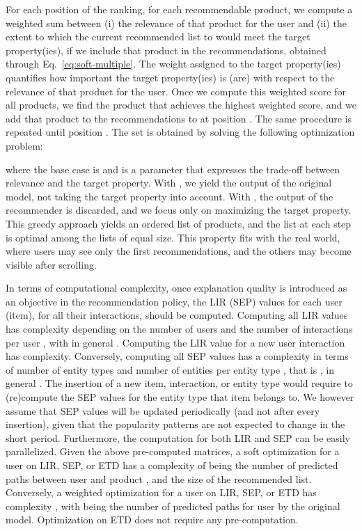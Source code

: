 \documentclass[sigconf]{acmart}
\begin{document}
For each position  of the ranking, for each recommendable product, we compute a weighted sum between (i) the relevance of that product for the user  and (ii) {\color{black} the extent to which the current recommended list to  would meet the target property(ies), if we include that product in the recommendations, obtained through Eq.~\eqref{eq:soft-multiple}.} 
The weight  assigned to the target property(ies) quantifies how important the target property(ies) is (are) with respect to the relevance of that product for the user. 
Once we compute this weighted score for all products, we find the product that achieves the highest weighted score, and we add that product to the recommendations to  at position . 
The same procedure is repeated until position .
The set  is obtained by solving the following optimization problem: 



\noindent where the base case is  and  is a parameter that expresses the trade-off between relevance and the target property. 
With , we yield the output of the original model, not taking the target property into account.
With , the output of the recommender is discarded, and we focus only on maximizing the target property. 
This greedy approach yields an ordered list of products, and the list at each step is  optimal among the lists of equal size. 
This property fits with the real world, where users may see only the first  recommendations, and the others may become visible after scrolling. 

\vspace{1mm} In terms of computational complexity, once explanation quality is introduced as an objective in the recommendation policy, the LIR (SEP) values for each user (item), for all their interactions, should be computed. Computing all LIR values has  complexity depending on the number of users  and the number of interactions per user , with in general . Computing the LIR value for a new user interaction has  complexity. Conversely, computing all SEP values has a complexity in terms of number of entity types  and number of entities per entity type , that is , in general .  The insertion of a new item, interaction, or entity type would require to (re)compute the SEP values for the entity type that item belongs to. We however assume that SEP values will be updated periodically (and not after every insertion), given that the popularity patterns are not expected to change in the short period. Furthermore, the computation for both LIR and SEP can be easily parallelized. Given the above pre-computed matrices, a soft optimization for a user on LIR, SEP, or ETD has a complexity of  being  the number of predicted paths between user  and product , and  the size of the recommended list. Conversely, a weighted optimization for a user on LIR, SEP, or ETD has complexity , with  being the number of predicted paths for user  by the original model. Optimization on ETD does not require any pre-computation. 
\end{document}
